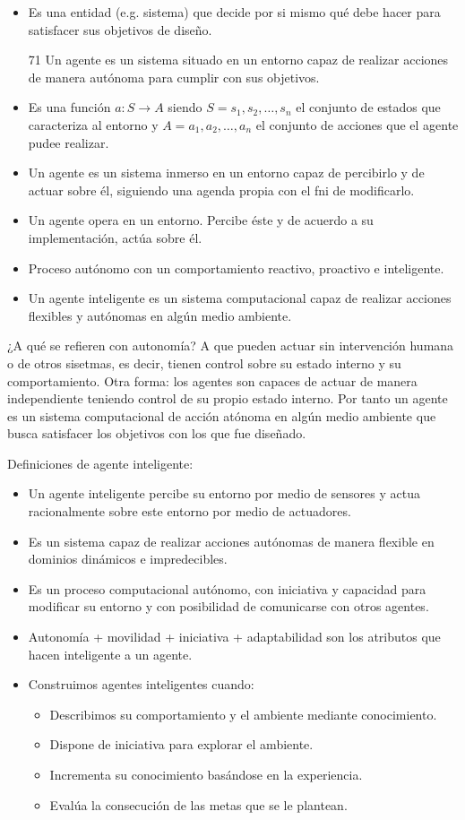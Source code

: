 \begin{itemize}
	\item Es una entidad (e.g. sistema) que decide por si mismo qué debe hacer para satisfacer sus objetivos de diseño.
	\item [71] Un agente es un sistema situado en un entorno capaz de realizar acciones de manera autónoma para cumplir con sus objetivos.
	\item Es una función $a: S \rightarrow A$ siendo $S = {s_1, s_2, \ldots, s_n}$ el conjunto de estados que caracteriza al entorno y $A = {a_1, a_2, \ldots, a_n}$ el conjunto de acciones que el agente pudee realizar.
	\item Un agente es un sistema inmerso en un entorno capaz de percibirlo y de actuar sobre él, siguiendo una agenda propia con el fni de modificarlo.
	\item Un agente opera en un entorno. Percibe éste y de acuerdo a su implementación, actúa sobre él.
	\item Proceso autónomo con un comportamiento reactivo, proactivo e inteligente.
	\item Un agente inteligente es un sistema computacional capaz de realizar acciones flexibles y autónomas en algún medio ambiente.
\end{itemize}

¿A qué se refieren con autonomía? A que pueden actuar sin intervención humana o de otros sisetmas, es decir, tienen control sobre su estado interno y su comportamiento. Otra forma: los agentes son capaces de actuar de manera independiente teniendo control de su propio estado interno. Por tanto un agente es un sistema computacional de acción atónoma en algún medio ambiente que busca satisfacer los objetivos con los que fue diseñado.

Definiciones de agente inteligente:

\begin{itemize}
	\item Un agente inteligente percibe su entorno por medio de sensores y actua racionalmente sobre este entorno por medio de actuadores.
	\item Es un sistema capaz de realizar acciones autónomas de manera flexible en dominios 	dinámicos e impredecibles.
	\item Es un proceso computacional autónomo, con iniciativa y capacidad para modificar su entorno y con posibilidad de comunicarse con otros agentes.
	\item Autonomía + movilidad + iniciativa + adaptabilidad son los atributos que hacen inteligente a un agente.
	\item Construimos agentes inteligentes cuando:
	\begin{itemize}
		\item Describimos su comportamiento y el ambiente mediante conocimiento.
		\item Dispone de iniciativa para explorar el ambiente.
		\item Incrementa su conocimiento basándose en la experiencia.
		\item Evalúa la consecución de las metas que se le plantean.
	\end{itemize}
\end{itemize}

